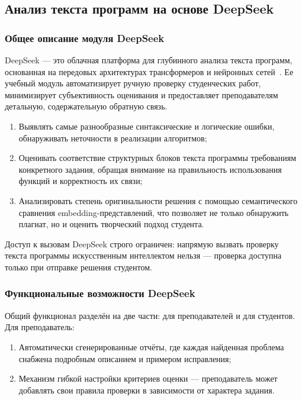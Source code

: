 \subsection{Анализ текста программ на основе DeepSeek}

\subsubsection{Общее описание модуля DeepSeek}

DeepSeek —  это облачная платформа для глубинного анализа текста программ, основанная на передовых архитектурах трансформеров и нейронных сетей~\cite{deepseek_docs}. Ее учебный модуль автоматизирует ручную проверку студенческих работ, минимизирует субъективность оценивания и предоставляет преподавателям детальную, содержательную обратную связь.

\begin{enumerate}
  \item Выявлять самые разнообразные синтаксические и логические ошибки, обнаруживать неточности в реализации алгоритмов;
  \item Оценивать соответствие структурных блоков текста программы требованиям конкретного задания, обращая внимание на правильность использования функций и корректность их связи;
  \item Анализировать степень оригинальности решения с помощью семантического сравнения embedding‐представлений, что позволяет не только обнаружить плагиат, но и оценить творческий подход студента.
\end{enumerate}

Доступ к вызовам DeepSeek строго ограничен: напрямую вызвать проверку текста программы искусственным интеллектом нельзя --- проверка доступна только при отправке решения студентом.

\subsubsection{Функциональные возможности DeepSeek}

Общий функционал разделён на две части: для преподавателей и для студентов. Для преподаватель:

\begin{enumerate}
    \item Автоматически сгенерированные отчёты, где каждая найденная проблема снабжена подробным описанием и примером исправления;
    \item Механизм гибкой настройки критериев оценки — преподаватель может добавлять свои правила проверки в зависимости от характера задания.
\end{enumerate}

